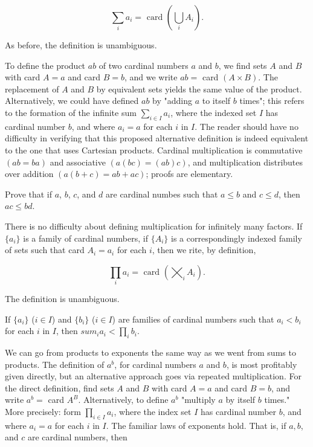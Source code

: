 \begin{equation*}
\sum_{i} a_{i} = \text{ card } (\bigcup_{i} A_{i} ).
\end{equation*}

As before, the definition is unambiguous.

To define the product $ab$ of two cardinal numbers $a$ and $b$, we find sets $A$ and $B$ with card $A = a$ and card $B = b$, and we write $ab =$ card $(A \times B)$. The replacement of $A$ and $B$ by equivalent sets yields the same value of the product. Alternatively, we could have defined $ab$ by "adding $a$ to itself $b$ times"; this refers to the formation of the infinite sum $\sum_{i \in I} a_{i}$, where the indexed set $I$ has cardinal number $b$, and where $a_{i} = a$ for each $i$ in $I$. The reader should have no difficulty in verifying that this proposed alternative definition is indeed equivalent to the one that uses Cartesian products. Cardinal multiplication is commutative $(ab = ba)$ and associative $(a(bc) = (ab)c)$, and multiplication distributes over addition $(a(b + c) = ab + ac)$; proofs are elementary. 

\begin{exercise} Prove that if $a$, $b$, $c$, and $d$ are cardinal numbes such that $a \le b$ and $c \le d$, then $ac \le bd$.
\end{exercise}

There is no difficulty about defining multiplication for infinitely many factors. If $\{ a_{i} \}$ is a family of cardinal numbers, if $\{ A_{i} \}$ is a correspondingly indexed family of sets such that card $A_{i} = a_{i}$ for each $i$, then we rite, by definition, 

\begin{equation*}
\prod_{i} a_{i} = \text{ card } ( \bigtimes_{i} A_{i} ).
\end{equation*}

The definition is unambiguous. 

\begin{exercise} If $\{ a_{i} \}$ ($i \in I$) and $\{ b_{i} \}$ ($i \in I$) are families of cardinal numbers such that $a_{i} < b_{i}$ for each $i$ in $I$, then $sum_{i}a_{i} < \prod_{i}b_{i}$. 
\end{exercise}

We can go from products to exponents the same way as we went from sums to products. The definition of $a^{b}$, for cardinal numbers $a$ and $b$, is most profitably given directly, but an alternative approach goes via repeated multiplication. For the direct definition, find sets $A$ and $B$ with card $A = a$ and card $B = b$, and write $a^{b} =$ card $A^{B}$. Alternatively, to define $a^{b}$ "multiply $a$ by itself $b$ times." More precisely: form $\prod_{i \in I} a_{i}$, where the index set $I$ has cardinal number $b$, and where $a_{i} = a$ for each $i$ in $I$. The familiar laws of exponents hold. That is, if $a, b$, and $c$ are cardinal numbers, then 

